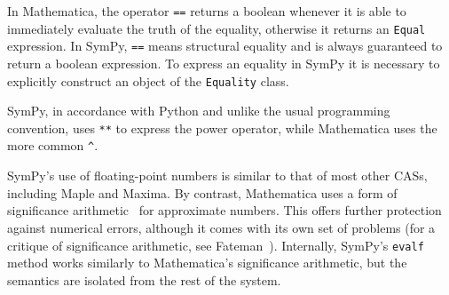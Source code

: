 In Mathematica, the operator \texttt{==} returns a boolean whenever it is able
to immediately evaluate the truth of the equality, otherwise it returns an
\texttt{Equal} expression.  In SymPy, \texttt{==} means structural equality and
is always guaranteed to return a boolean expression.  To express an equality in
SymPy it is necessary to explicitly construct an object of the \texttt{Equality}
class.


SymPy, in accordance with Python and unlike the usual programming convention,
uses \texttt{**} to express the power operator, while Mathematica uses the more
common \verb|^|.


SymPy's use of floating-point numbers is similar to that of most
other CASs, including Maple and Maxima.
By contrast, Mathematica uses a form
of significance arithmetic~\cite{Sofroniou2005precise} for approximate numbers.
This offers further protection against numerical errors,
although it comes with its own set of problems
(for a critique of significance arithmetic, see Fateman~\cite{Fateman1992}).
Internally, SymPy's \texttt{evalf} method works similarly to Mathematica's
significance arithmetic, but the semantics are isolated from the rest of the system.
